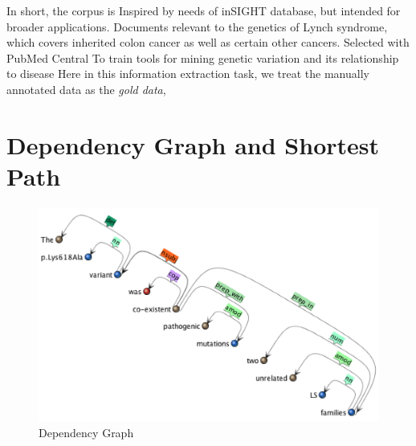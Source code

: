 In short, the corpus is Inspired by needs of inSIGHT database, but intended for broader applications. Documents relevant to the genetics of Lynch syndrome, which covers inherited colon cancer as well as certain other cancers. Selected with PubMed Central To train tools for mining genetic variation and its relationship to disease
Here in this information extraction task, we treat the manually annotated data as the \emph{gold data}, 
\section{Dependency Graph and Shortest Path}
	\begin{figure}
		\centering
			\includegraphics[width=\textwidth]{Dependency_Graph}
			\caption{Dependency Graph}
			\label{fig:Dependency_Graph}   
	\end{figure}

